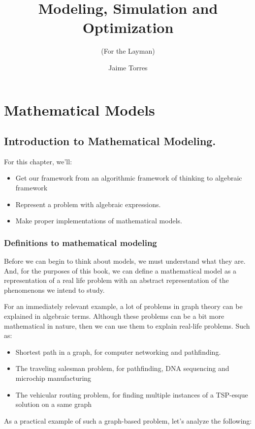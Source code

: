 \documentclass{textbook}
\title     {Modeling, Simulation and Optimization}
\subtitle  {(For the Layman)}
\author    {Jaime Torres}
\begin{document}
\tableofcontents

\part{Mathematical Models}

\chapter{Introduction to Mathematical Modeling.}

For this chapter, we'll:

\begin{itemize}
    \item Get our framework from an algorithmic framework of thinking to algebraic 
    framework
    \item Represent a problem with algebraic expressions.
    \item Make proper implementations of mathematical models.
\end{itemize}

\section{Definitions to mathematical modeling}

Before we can begin to think about models, we must understand what they are.
And, for the purposes of this book, we can define a mathematical model as a representation
of a real life problem with an abstract representation of the phenomenons we intend to study.

For an immediately relevant example, a lot of problems in graph theory can be explained in algebraic terms.
Although these problems can be a bit more mathematical in nature, then we can use them to explain real-life problems.
Such as:

\begin{itemize}
    \item Shortest path in a graph, for computer networking and pathfinding.
    \item The traveling salesman problem, for pathfinding, DNA sequencing and microchip manufacturing 
    \item The vehicular routing problem, for finding multiple instances of a TSP-esque solution on a same graph
\end{itemize}

As a practical example of such a graph-based problem, let's analyze the following:
\end{document}
